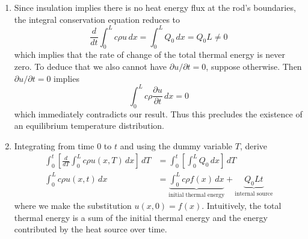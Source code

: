 \documentclass[a4paper]{article}
\begin{document}
\begin{enumerate}[label=(\alph*)]
	\item Since insulation implies there is no heat energy flux at the rod's boundaries, the integral conservation equation reduces to
	\[
		\frac{d }{dt}\int^{L}_{0} c \rho u \, dx = \int^{L}_{0} Q_{0} \, dx = Q_{0}L \neq 0
	\]
	which implies that the rate of change of the total thermal energy is never zero. To deduce that we also cannot have \( \partial u / \partial t = 0 \), suppose otherwise. Then \( \partial u / \partial t = 0 \) implies
	\[
		\int^{L}_{0} c \rho \frac{\partial u}{\partial t} \, dx = 0  
	\]
	which immediately contradicts our result. Thus this precludes the existence of an equilibrium temperature distribution.
	\item Integrating from time \( 0 \) to \( t \) and using the dummy variable \( T \), derive
	\begin{align*}		
		\int^{t}_{0} \!\left[ \frac{d }{dT}\int^{L}_{0} c \rho u \!\left( x,T \right) \, dx \right] \, dT & = \int^{t}_{0} \!\left[ \int^{L}_{0} Q_{0} \, dx \right] \, dT \\
		\int^{L}_{0} c \rho u \!\left( x,t \right) \, dx & = \underbrace{\int^{L}_{0} c \rho f \!\left( x \right) \, dx}_{\text{initial thermal energy}} + \underbrace{Q_{0}Lt}_{\text{internal source}}
	\end{align*}
	where we make the substitution \( u \!\left( x,0 \right) = f \!\left( x \right) \). Intuitively, the total thermal energy is a sum of the initial thermal energy and the energy contributed by the heat source over time.
\end{enumerate}

\end{document}
